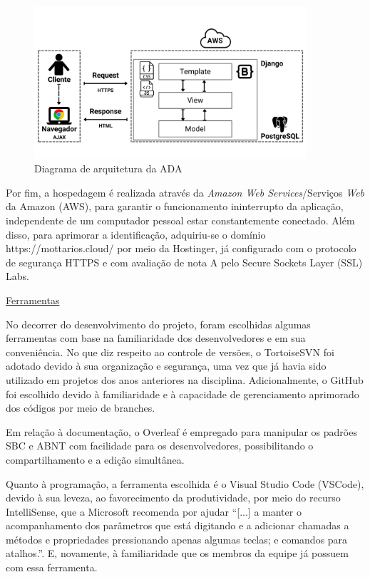 \documentclass[12pt]{article}
\begin{document}
\begin{figure}[h]
    \centering
    \includegraphics[width=0.9\textwidth]{diagramaarquitetura.png}
    \caption{Diagrama de arquitetura da ADA}
    \label{fig:diagrama}
\end{figure}
\par Por fim, a hospedagem é realizada através da \textit{Amazon Web Services}/Serviços \textit{Web} da Amazon (AWS), para garantir o funcionamento ininterrupto da aplicação, independente de um computador pessoal estar constantemente conectado. Além disso, para aprimorar a identificação, adquiriu-se o domínio https://mottarios.cloud/ por meio da Hostinger, já configurado com o protocolo de segurança HTTPS e com avaliação de nota A pelo Secure Sockets Layer (SSL) Labs.

\par \underline{Ferramentas}
\par No decorrer do desenvolvimento do projeto, foram escolhidas algumas ferramentas com base na familiaridade dos desenvolvedores e em sua conveniência. 
No que diz respeito ao controle de versões, o TortoiseSVN foi adotado devido à sua organização e segurança, uma vez que já havia sido utilizado em projetos dos anos anteriores na disciplina. Adicionalmente, o GitHub foi escolhido devido à familiaridade e à capacidade de gerenciamento aprimorado dos códigos por meio de branches.
\par Em relação à documentação, o Overleaf é empregado para manipular os padrões SBC e ABNT com facilidade para os desenvolvedores, possibilitando o compartilhamento e a edição simultânea.
\par Quanto à programação, a ferramenta escolhida é o Visual Studio Code (VSCode), devido à sua leveza, ao favorecimento da produtividade, por meio do recurso IntelliSense, que a Microsoft recomenda por ajudar “[...] a manter o acompanhamento dos parâmetros que está digitando e a adicionar chamadas a métodos e propriedades pressionando apenas algumas teclas; e comandos para atalhos.”. E, novamente, à familiaridade que os membros da equipe já possuem com essa ferramenta.
\end{document}
